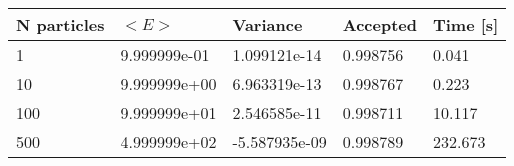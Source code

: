 \begin{table}[h!]
\centering 
\begin{tabular}{|l|l|l|l|l|}
\hline 
N particles & $<E>$ & Variance & Accepted & Time [s]\\ 
 \hline 
1 & 9.999999e-01 & 1.099121e-14 & 0.998756 & 0.041 \\ \hline 
10 & 9.999999e+00 & 6.963319e-13 & 0.998767 & 0.223 \\ \hline 
100 & 9.999999e+01 & 2.546585e-11 & 0.998711 & 10.117 \\ \hline 
500 & 4.999999e+02 & -5.587935e-09 & 0.998789 & 232.673 \\ \hline 
\end{tabular}
\label{tab:in2} 
\end{table} 
